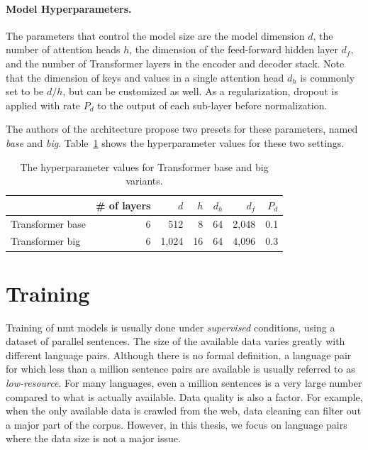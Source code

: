 \paragraph{Model Hyperparameters.} The parameters that control the model size
are the model dimension $d$, the number of attention heads $h$, the dimension
of the feed-forward hidden layer $d_f$, and the number of Transformer layers in
the encoder and decoder stack. Note that the dimension of keys and values in a
single attention head $d_h$ is commonly set to be $d / h$, but can be
customized as well.  As a regularization, dropout \citep{srivastava2014dropout}
is applied with rate $P_d$ to the output of each sub-layer before
normalization.

The authors of the architecture propose two presets for these parameters, named
\emph{base} and \emph{big}. Table~\ref{tab:transformer-hyperparams} shows the
hyperparameter values for these two settings.

\begin{table}
  \centering
  \begin{tabular}{lrrrrrr}
    \toprule
      & \# of layers &  $d$  &  $h$  & $d_h$ & $d_f$ & $P_d$ \\
    \midrule
    Transformer base  & 6 &  512  & 8 & 64 &  2,048 & 0.1 \\
    Transformer big  & 6 &  1,024  & 16 & 64 &  4,096 & 0.3 \\
    \bottomrule
  \end{tabular}
  \caption{The hyperparameter values for Transformer base and big variants.}%
  \label{tab:transformer-hyperparams}
\end{table}


\section{Training}
\label{sec:training}

Training of \ac{nmt} models is usually done under \emph{supervised} conditions,
using a dataset of parallel sentences. The size of the available data varies
greatly with different language pairs. Although there is no formal definition,
a language pair for which less than a million sentence pairs are available is
usually referred to as \emph{low-resource}. For many languages, even a million
sentences is a very large number compared to what is actually available. Data
quality is also a factor. For example, when the only available data is crawled
from the web, data cleaning can filter out a major part of the corpus. However,
in this thesis, we focus on language pairs where the data size is not a major
issue.


